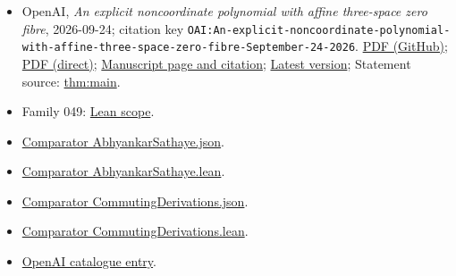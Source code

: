 \documentclass[11pt]{article}
\begin{document}
\begin{itemize}
\item OpenAI, \emph{An explicit noncoordinate polynomial with affine three-space zero fibre}, 2026-09-24; citation key \texttt{OAI:An-explicit-noncoordinate-polynomial-with-affine-three-space-zero-fibre-September-24-2026}. \href{https://github.com/openai/math/blob/adc7f1241b42e322a6451854ab7e4b4c146bf78a/preprints/An-explicit-noncoordinate-polynomial-with-affine-three-space-zero-fibre-September-24-2026/paper.pdf}{PDF (GitHub)}; \href{https://github.com/openai/math/raw/adc7f1241b42e322a6451854ab7e4b4c146bf78a/preprints/An-explicit-noncoordinate-polynomial-with-affine-three-space-zero-fibre-September-24-2026/paper.pdf}{PDF (direct)}; \href{https://github.com/openai/math/blob/adc7f1241b42e322a6451854ab7e4b4c146bf78a/preprints/An-explicit-noncoordinate-polynomial-with-affine-three-space-zero-fibre-September-24-2026/README.md}{Manuscript page and citation}; \href{https://github.com/openai/math/blob/main/preprints/An-explicit-noncoordinate-polynomial-with-affine-three-space-zero-fibre-September-24-2026/paper.pdf}{Latest version}; Statement source: \href{https://github.com/openai/math/blob/adc7f1241b42e322a6451854ab7e4b4c146bf78a/preprints/An-explicit-noncoordinate-polynomial-with-affine-three-space-zero-fibre-September-24-2026/build/paper.tex\#L103}{thm:main}.
\item Family 049: \href{https://github.com/openai/math/blob/adc7f1241b42e322a6451854ab7e4b4c146bf78a/lean/docs/049.md}{Lean scope}.
\item \href{https://github.com/openai/math/blob/adc7f1241b42e322a6451854ab7e4b4c146bf78a/lean/ComparatorChallenges/AbhyankarSathaye.json}{Comparator AbhyankarSathaye.json}.
\item \href{https://github.com/openai/math/blob/adc7f1241b42e322a6451854ab7e4b4c146bf78a/lean/ComparatorChallenges/AbhyankarSathaye.lean}{Comparator AbhyankarSathaye.lean}.
\item \href{https://github.com/openai/math/blob/adc7f1241b42e322a6451854ab7e4b4c146bf78a/lean/ComparatorChallenges/CommutingDerivations.json}{Comparator CommutingDerivations.json}.
\item \href{https://github.com/openai/math/blob/adc7f1241b42e322a6451854ab7e4b4c146bf78a/lean/ComparatorChallenges/CommutingDerivations.lean}{Comparator CommutingDerivations.lean}.
\item \href{https://github.com/openai/math/blob/adc7f1241b42e322a6451854ab7e4b4c146bf78a/CONTENTS.md}{OpenAI catalogue entry}.
\end{itemize}
\end{document}
